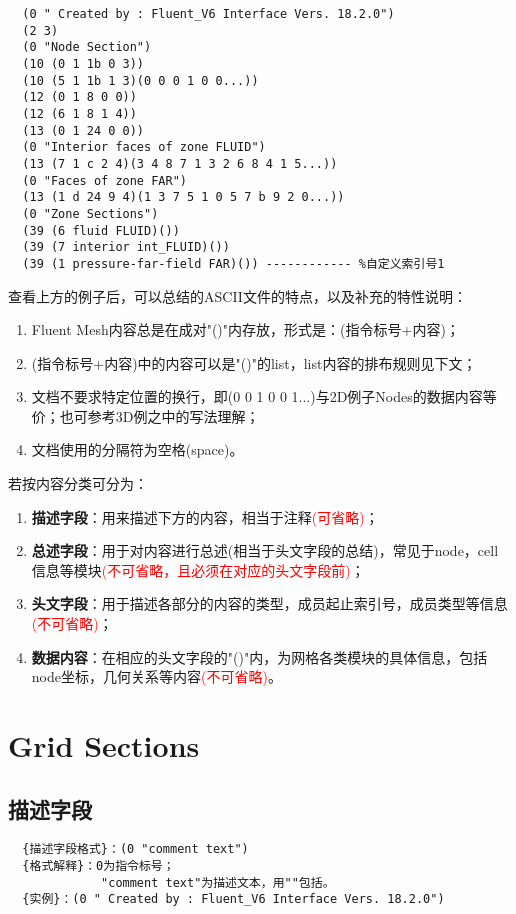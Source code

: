 \documentclass[lang=cn,11pt,a4paper]{elegantpaper} %
\begin{document}
\begin{lstlisting}
  (0 " Created by : Fluent_V6 Interface Vers. 18.2.0")
  (2 3)
  (0 "Node Section")
  (10 (0 1 1b 0 3))
  (10 (5 1 1b 1 3)(0 0 0 1 0 0...))
  (12 (0 1 8 0 0))
  (12 (6 1 8 1 4))
  (13 (0 1 24 0 0))
  (0 "Interior faces of zone FLUID")
  (13 (7 1 c 2 4)(3 4 8 7 1 3 2 6 8 4 1 5...))
  (0 "Faces of zone FAR")
  (13 (1 d 24 9 4)(1 3 7 5 1 0 5 7 b 9 2 0...))
  (0 "Zone Sections")
  (39 (6 fluid FLUID)())
  (39 (7 interior int_FLUID)())
  (39 (1 pressure-far-field FAR)()) ------------ %自定义索引号1
\end{lstlisting}

查看上方的例子后，可以总结的ASCII文件的特点，以及补充的特性说明：
\begin{enumerate}
  \item Fluent Mesh内容总是在成对"()"内存放，形式是：(指令标号+内容)；
  \item (指令标号+内容)中的内容可以是"()"的list，list内容的排布规则见下文；
  \item 文档不要求特定位置的换行，即(0 0 1 0 0 1...)与2D例子Nodes的数据内容等价；也可参考3D例之中的写法理解；
  \item 文档使用的分隔符为空格(space)。
\end{enumerate}

若按内容分类可分为：
\begin{enumerate}
  \item \textbf{描述字段}：用来描述下方的内容，相当于注释\textcolor{red}{(可省略)}；
  \item \textbf{总述字段}：用于对内容进行总述(相当于头文字段的总结)，常见于node，cell信息等模块\textcolor{red}{(不可省略，且必须在对应的头文字段前)}；
  \item \textbf{头文字段}：用于描述各部分的内容的类型，成员起止索引号，成员类型等信息\textcolor{red}{(不可省略)}；
  \item \textbf{数据内容}：在相应的头文字段的"()"内，为网格各类模块的具体信息，包括node坐标，几何关系等内容\textcolor{red}{(不可省略)}。
\end{enumerate}


\section{Grid Sections}\label{GridSections}

\subsection{描述字段}\label{Comment}
\begin{lstlisting}
  {描述字段格式}：(0 "comment text")
  {格式解释}：0为指令标号；
             "comment text"为描述文本，用""包括。
  {实例}：(0 " Created by : Fluent_V6 Interface Vers. 18.2.0")
\end{lstlisting}
\end{document}
